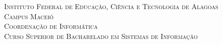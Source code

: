 \documentclass[
	12pt,				%
	openany,			%
	oneside,			%
	a4paper,			%
	english,			%
	french,				%
	spanish,			%
	brazil				%
	]{abntex2}
\begin{document}

\frenchspacing 



\begin{center}

\textsf{\textsc{Instituto Federal de Educação, Ciência e Tecnologia de Alagoas\\
 Campus Maceió\\
 Coordenação de Informática \\
 Curso Superior de Bacharelado em Sistemas de Informação 
}} 

\end{center}


\imprimircapa

\imprimirfolhaderosto*


%
%     

	
	
\end{document}
